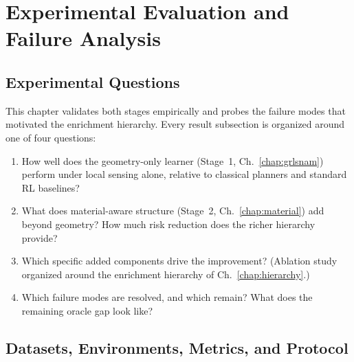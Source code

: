 
\chapter{Experimental Evaluation and Failure Analysis}
\label{chap:experiments}

\providecommand{\Ham}{\mathcal{H}}
\providecommand{\Potential}{\mathcal{R}}
\providecommand{\PhaseState}{z}
\providecommand{\Pos}{q}
\providecommand{\Mom}{p}
\providecommand{\Mass}{\mathrm{M}}

\section{Experimental Questions}
\label{sec:ch6:questions}

This chapter validates both stages empirically and probes
the failure modes that motivated the enrichment hierarchy.
Every result subsection is organized around one of four questions:

\begin{enumerate}
  \item[\textbf{Q1.}]
        How well does the geometry-only learner (Stage~1, Ch.~\ref{chap:grlsnam})
        perform under local sensing alone, relative to classical planners
        and standard RL baselines?
  \item[\textbf{Q2.}]
        What does material-aware structure (Stage~2, Ch.~\ref{chap:material})
        add beyond geometry? How much risk reduction does the richer
        hierarchy provide?
  \item[\textbf{Q3.}]
        Which specific added components drive the improvement?
        (Ablation study organized around the enrichment hierarchy of
        Ch.~\ref{chap:hierarchy}.)
  \item[\textbf{Q4.}]
        Which failure modes are resolved, and which remain?
        What does the remaining oracle gap look like?
\end{enumerate}

\section{Datasets, Environments, Metrics, and Protocol}
\label{sec:ch6:setup}

